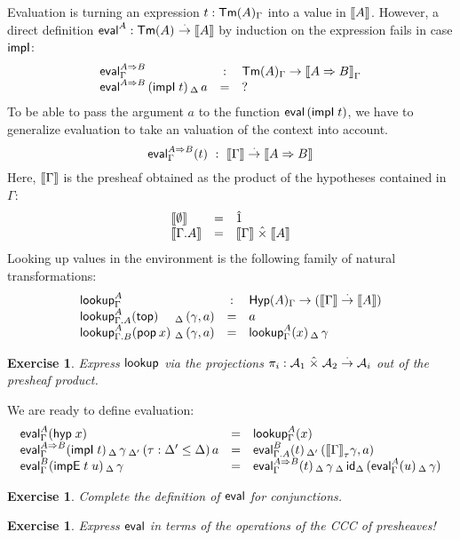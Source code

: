 \documentclass[a4paper]{article}
\newtheorem{exercise}[theorem]{Exercise}
\begin{document}
Evaluation is turning an expression $t : \TmG A$ into a value in
$\den A$.  However, a direct definition $\teval^A : \Tm A \todot \den A$
by induction on the expression fails in case $\timpI$:
\[
\begin{array}{lcl}
   \teval^{A \imp B}_\Gamma & : & \TmG A \to \den {A \imp B} _\Gamma \\
   \teval^{A \imp B}\,(\impI t)\,_\Delta\,a & = & ? \\
\end{array}
\]
To be able to pass the argument $a$ to the function $\teval\,(\impI
t)$, we have to generalize evaluation to take an valuation of the
context into account.
\[
  \evalG{A \imp B}t  ~:~ \den \Gamma \todot \den {A \imp B}
\]
Here, $\den \Gamma$ is the presheaf obtained as the product of the
hypotheses contained in $\Gamma$:
\[
\begin{array}{lll}
  \den{\cempty} & = & \hatone \\
  \den{\Gamma.A} & = & \den\Gamma \hattimes \den A \\
\end{array}
\]
Looking up values in the environment is the following family of
natural transformations:
\[
\begin{array}{l@{~}lcl}
  \multicolumn 2 l {\tlookup^A_\Gamma} & : & \HypG A \to (\den \Gamma \todot \den A) \\
  \lookup[\Gamma.A]A \ttop    &_\Delta\,(\gamma,a) & = & a \\
  \lookup[\Gamma.B]A {\pop x} &_\Delta\,(\gamma,a) & = & \lookup[\Gamma]A x\,_\Delta\, \gamma \\
\end{array}
\]
\begin{exercise}
  Express $\tlookup$ via the projections
  $\pi_i : \A_1 \hattimes \A_2 \todot \A_i$
  out of the presheaf product.
\end{exercise}
We are ready to define evaluation:
\[
\begin{array}{lcl}
  \evalG A {\hyp x} & = & \lookupG A x \\
  \evalG {A \imp B} {\impI t}\,_\Delta\,\gamma\,_{\Delta'}\,(\tau : \Delta' \leq \Delta)\,a
    & = & \eval[\Gamma.A]B t\,_{\Delta'}\,(\den\Gamma_\tau\gamma,a) \\
  \evalG {B} {\impE t u}\,_\Delta\,\gamma & = &
    \evalG {A \imp B} t\,_\Delta\,\gamma\,_\Delta\,\id[\Delta]\,
      (\evalG A u\,_\Delta\,\gamma) \\
\end{array}
\]
\begin{exercise}
  Complete the definition of $\teval$ for conjunctions.
\end{exercise}
\begin{exercise}
  Express $\teval$ in terms of the operations of the CCC of
  presheaves!
\end{exercise}
\end{document}

